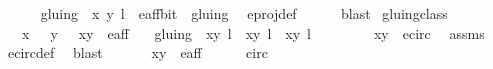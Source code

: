 \begin{isabellebody}
\ \ \ \ \isamarkupfalse%
\ {\isacartoucheopen}gluing\ {\isacharbackquote}{\isacharbackquote}\ {\isacharbraceleft}{\isacharparenleft}{\isacharparenleft}x{\isacharcomma}\ y{\isacharparenright}{\isacharcomma}\ l{\isacharparenright}{\isacharbraceright}\ {\isasymin}\ e{\isacharunderscore}aff{\isacharunderscore}bit\ {\isacharslash}{\isacharslash}\ gluing{\isacartoucheclose}\ \isamarkupfalse%
\ e{\isacharunderscore}proj{\isacharunderscore}def\isanewline
\ \ \ \ \isamarkupfalse%
\ blast\isanewline
{}\isamarkupfalse%
%
\endisatagproof
{\isafoldproof}%
%
\isadelimproof
\isanewline
%
\endisadelimproof
\isanewline
{}\isamarkupfalse%
\ gluing{\isacharunderscore}class{\isacharcolon}\isanewline
\ \ \ {\isachardoublequoteopen}x\ {\isasymnoteq}\ {}{\isachardoublequoteclose}\ {\isachardoublequoteopen}y\ {\isasymnoteq}\ {}{\isachardoublequoteclose}\ {\isachardoublequoteopen}{\isacharparenleft}x{\isacharcomma}y{\isacharparenright}\ {\isasymin}\ e{\isacharunderscore}aff{\isachardoublequoteclose}\isanewline
\ \ \ {\isachardoublequoteopen}gluing\ {\isacharbackquote}{\isacharbackquote}\ {\isacharbraceleft}{\isacharparenleft}{\isacharparenleft}x{\isacharcomma}y{\isacharparenright}{\isacharcomma}\ l{\isacharparenright}{\isacharbraceright}\ {\isacharequal}\ {\isacharbraceleft}{\isacharparenleft}{\isacharparenleft}x{\isacharcomma}y{\isacharparenright}{\isacharcomma}\ l{\isacharparenright}{\isacharcomma}\ {\isacharparenleft}{\isasymtau}\ {\isacharparenleft}x{\isacharcomma}y{\isacharparenright}{\isacharcomma}\ l\ {\isacharplus}\ {}{\isacharparenright}{\isacharbraceright}{\isachardoublequoteclose}\isanewline
%
\isadelimproof
%
\endisadelimproof
%
\isatagproof
{}\isamarkupfalse%
\ {\isacharminus}\ \isanewline
\ \ \isamarkupfalse%
\ {\isachardoublequoteopen}{\isacharparenleft}x{\isacharcomma}y{\isacharparenright}\ {\isasymin}\ e{\isacharunderscore}circ{\isachardoublequoteclose}\ \isamarkupfalse%
\ assms\ \isamarkupfalse%
\ e{\isacharunderscore}circ{\isacharunderscore}def\ \isamarkupfalse%
\ blast\isanewline
\ \ \isamarkupfalse%
\ \isamarkupfalse%
\ {\isachardoublequoteopen}{\isasymtau}\ {\isacharparenleft}x{\isacharcomma}y{\isacharparenright}\ {\isasymin}\ e{\isacharunderscore}aff{\isachardoublequoteclose}\isanewline
\ \ \ \ \isamarkupfalse%
\ {\isasymtau}{\isacharunderscore}circ\ \isamarkupfalse%

\end{isabellebody}
